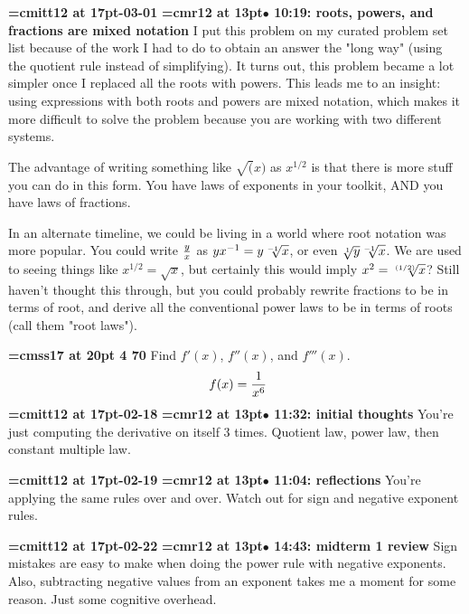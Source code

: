 {\medskip\noindent\bf\font\titlefont=cmitt12 at 17pt-03-01}\medskip
{\smallskip\noindent\bf\font\titlefont=cmr12 at 13pt\titlefont $\bullet$ 10:19: roots, powers, and fractions are mixed notation}\smallskip
I put this problem on my curated problem set list because of the work I had to do to obtain an answer the "long way" (using the quotient rule instead of simplifying). It turns out, this problem became a lot simpler once I replaced all the roots with powers. This leads me to an insight: using expressions with both roots and powers are mixed notation, which makes it more difficult to solve the problem because you are working with two different systems.
\par

The advantage of writing something like $\sqrt(x)$ as $x^{1/2}$ is that there is more stuff you can do in this form. You have laws of exponents in your toolkit, AND you have laws of fractions.
\par

In an alternate timeline, we could be living in a world where root notation was more popular. You could write ${y \over x}$ as $y x^{-1} = y {\root -1 \of x}$, or even ${\root 1 \of y}{\root -1 \of x}$. We are used to seeing things like $x^{1/2} = \sqrt{x}$, but certainly this would imply $x^2 = {\root (1/2) \of x}$? Still haven't thought this through, but you could probably rewrite fractions to be in terms of root, and derive all the conventional power laws to be in terms of roots (call them "root laws").
\par

{\medskip\noindent\bf\font\titlefont=cmss17 at 20pt 4 70}\medskip
Find $f'(x)$, $f''(x)$, and $f'''(x)$.
$$\
f(x) = {1 \over x^6}
$$
{\medskip\noindent\bf\font\titlefont=cmitt12 at 17pt-02-18}\medskip
{\smallskip\noindent\bf\font\titlefont=cmr12 at 13pt\titlefont $\bullet$ 11:32: initial thoughts}\smallskip
You're just computing the derivative on itself 3 times. Quotient law, power law, then constant multiple law.
\par

{\medskip\noindent\bf\font\titlefont=cmitt12 at 17pt-02-19}\medskip
{\smallskip\noindent\bf\font\titlefont=cmr12 at 13pt\titlefont $\bullet$ 11:04: reflections}\smallskip
You're applying the same rules over and over. Watch out for sign and negative exponent rules.
\par

{\medskip\noindent\bf\font\titlefont=cmitt12 at 17pt-02-22}\medskip
{\smallskip\noindent\bf\font\titlefont=cmr12 at 13pt\titlefont $\bullet$ 14:43: midterm 1 review}\smallskip
Sign mistakes are easy to make when doing the power rule with negative exponents. Also, subtracting negative values from an exponent takes me a moment for some reason. Just some cognitive overhead.
\par

